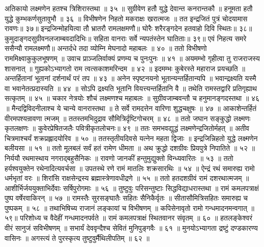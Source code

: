 अतिकायो लक्ष्मणेन हतश्च त्रिशिरास्तथा ॥ ३५ ॥
सुग्रीवेण हतौ युद्धे देवान्त कनरान्तकौ ॥
हनूमता हतौ युद्धे कुम्भकर्णसुतावुभौ ॥ ३६ ॥
विभीषणेन निहतो मकराक्षः खरात्मजः ॥
तत इन्द्रजितं पुत्रं चोदयामास रावणः॥ ३७॥
इन्द्रजिन्मोहयित्वा तौ भ्रातरौ रामलक्षमणौ॥
घोरैः शरैरङ्गदेन हतवाहो दिवि स्थितः॥ ३८॥
कुमुदाङ्गदसुग्रीवनलजाम्बवदादिभिः॥
सहिता वानराः सर्वे न्यपतंस्तेन घातिताः॥ ३९॥
एवं निहत्य समरे ससैन्यौ रामलक्ष्मणौ॥
अन्तर्दधे तदा व्योम्नि मेघनादो महाबलः ॥ ४० ॥
ततो विभीषणो राममिक्ष्वाकुकुलभूषणम् ॥
उवाच प्राञ्जलिर्वाक्यं प्रणम्य च पुनःपुनः ॥ ४१ ॥
अयमम्भो गृहीत्वा तु राजराजस्य शासनात् ॥
गुह्यकोऽभ्यागतो राम त्वत्सकाशमरिन्दम ॥ ४२ ॥
इदमम्भः कुबेरस्ते महाराज प्रयच्छति ॥
अन्तर्हितानां भूतानां दर्शनार्थं परं तप ॥ ४३ ॥
अनेन स्पृष्टनयनो भूतान्यन्तर्हितान्यपि ॥
भवान्द्रक्ष्यति यस्मै वा भवानेतत्प्रदास्यति ॥ ४४ ॥
सोऽपि द्रक्ष्यति भूतानि वियत्त्यन्तर्हितानि वै ॥
तथेति रामस्तद्वारि प्रतिगृह्याथ सत्कृतम् ॥ ४५ ॥
चकार नेत्रयोः शौचं लक्ष्मणश्च महाबलः ॥
सुग्रीवजाम्बवन्तौ च हनुमानङ्गदस्तथा ॥ ४६ ॥
मैन्दद्विविदनीलाश्च ये चान्ये वानरास्तथा ॥
ते सर्वे रामदत्तेन वारिणा शुद्धचक्षुषः ॥ ४७ ॥
आकाशेन्तर्हितं वीरमपश्यन्रावणा त्मजम् ॥
ततस्तमभिदुद्राव सौमित्रिर्दृष्टिगोचरम् ॥ ४८ ॥
ततो जघान सङ्कुद्धो लक्ष्मणः कृतलक्षणः ॥
कुवेरप्रेषितजलैः पवित्रीकृतलोचनः॥ ४९ ॥
ततः समभवद्युद्धं लक्ष्मणेन्द्रजितोर्महत् ॥
अतीव चित्रमाश्चर्यं शक्रप्रह्लादयोरिव ॥ ५० ॥
ततस्तृतीयदिवसे यत्नेन महता द्विजाः ॥
इन्द्रजिन्निहतो युद्धे लक्ष्मणेन बलीयसा ॥ ५१ ॥
ततो मूलबलं सर्वं हतं रामेण धीमता ॥
अथ क्रुद्धो दशग्रीवः प्रियपुत्रे निपातिते ॥ ५२ ॥
निर्ययौ रथमास्थाय नगराद्बहुसैनिकः ॥
रावणो जानकीं हन्तुमुद्युक्तो विन्ध्यवारितः ॥ ५३ ॥
ततो हर्यश्वयुक्तेन रथेनादित्यवर्चसा ॥
उपतस्थे रणे रामं मातलिः शक्रसारथिः ॥ ५४ ॥
ऐन्द्रं रथं समारुह्य रामो धर्मभृतां वरः ॥
शिरांसि राक्षसेन्द्रस्य ब्रह्मास्त्रेणावधीद्रणे ॥ ५५ ॥
ततो हतदशग्रीवं रामं दशरथात्मजम् ॥
आशीर्भिर्जययुक्ताभिर्देवाः सर्षिपुरोगमाः ॥ ५६ ॥
तुष्टुवुः परिसन्तुष्टाः सिद्धविद्याधरास्तथा ॥
रामं कमलपत्राक्षं पुष्प वर्षेरवाकिरन् ॥ ५७ ॥
रामस्तैः सुरसङ्घातैः सहितः सैनिकैर्वृतः ॥
सीतासौमित्रिसहितः समारुह्य च पुष्पकम् ॥ ५८ ॥
तथाभिषिच्य राजानं लङ्कायां च विभीषणम् ॥
कपिसेनावृतो रामो गन्धमादनमन्वगात् ॥ ५९॥
परिशोध्य च वैदेहीं गन्धमादनपर्वते ॥
रामं कमलपत्राक्षं स्थितवानर संवृतम् ॥ ६० ॥
हतलङ्केश्वरं वीरं सानुजं सविभीषणम् ॥
सभार्यं देववृन्दैश्च सेवितं मुनिपुङ्गवैः ॥ ६१ ॥
मुनयोऽभ्यागता द्रष्टुं दण्डकारण्य वासिनः ॥
अगस्त्यं ते पुरस्कृत्य तुष्टुवुर्मैथिलीपतिम् ॥ ६२ ॥

